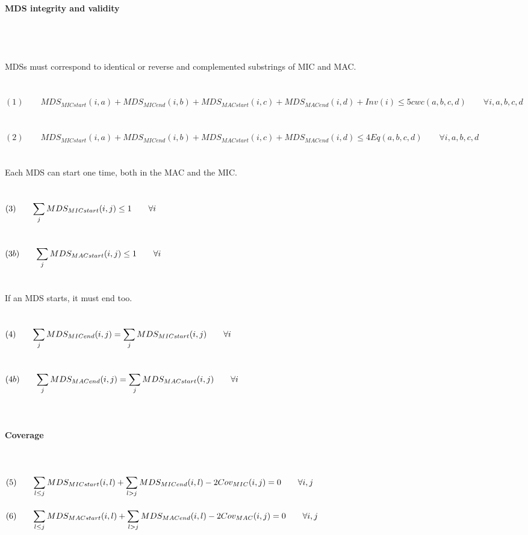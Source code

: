 \paragraph{MDS integrity and validity} $ $ \\\\\\
MDSs must correspond to identical or reverse and complemented substrings of MIC and MAC.
\\\\\\
$(1) \qquad MDS_{MICstart}(i,a) + MDS_{MICend}(i,b) + MDS_{MACstart}(i,c) + MDS_{MACend}(i,d) + Inv(i) \leq 5 cwc(a,b,c,d) \label{eq:someequation} \qquad \forall i,a,b,c,d$ \\\\\\
$(2) \qquad MDS_{MICstart}(i,a) + MDS_{MICend}(i,b) + MDS_{MACstart}(i,c) + MDS_{MACend}(i,d) \leq 4 Eq(a,b,c,d) \qquad \forall i,a,b,c,d $ \\\\\\
Each MDS can start one time, both in the MAC and the MIC. \\\\\\
$(3) \qquad \mathlarger{\sum_{j} MDS_{MICstart}(i,j)\leq 1 \qquad \forall i}$ \\\\\\
$(3b) \qquad \mathlarger{\sum_{j} MDS_{MACstart}(i,j)\leq 1 \qquad \forall i}$ \\\\\\
If an MDS starts, it must end too. \\\\\\
$(4) \qquad \mathlarger{\sum_{j} MDS_{MICend}(i,j) = \sum_{j} MDS_{MICstart}(i,j) \qquad \forall i}$ \\\\\\
$(4b) \qquad \mathlarger{\sum_{j} MDS_{MACend}(i,j) = \sum_{j} MDS_{MACstart}(i,j) \qquad \forall i}$ \\\\\\
\clearpage
\paragraph{Coverage} $ $
\\\\
$(5) \qquad \mathlarger{\sum_{l\leq j} MDS_{MICstart}(i,l) + \sum_{l>j}MDS_{MICend}(i,l) - 2Cov_{MIC}(i,j) = 0} \qquad \forall i,j $ \\\\
$(6) \qquad \mathlarger{\sum_{l\leq j} MDS_{MACstart}(i,l) + \sum_{l> j}MDS_{MACend}(i,l) - 2Cov_{MAC}(i,j) = 0} \qquad \forall i,j $ \\
